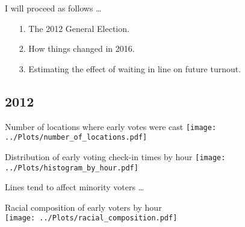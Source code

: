 \documentclass{beamer}
\begin{document}
		\begin{frame}
		I will proceed as follows \ldots
			\begin{itemize}
				\item[1.] The 2012 General Election.
				\item[2.] How things changed in 2016.
				\item[3.] Estimating the effect of waiting in line on future turnout.
			\end{itemize}
		\end{frame}
		
		\subsection{2012}
		
		\begin{frame}				
		\end{frame}
		
		\begin{frame}
		 Number of locations where early votes were cast			
			\centering
			\texttt{[image: ../Plots/number\_of\_locations.pdf]}
		\end{frame}
	
		\begin{frame}	
		Distribution of early voting check-in times by hour			
			\centering
			\texttt{[image: ../Plots/histogram\_by\_hour.pdf]}
		\end{frame}
		

		\begin{frame}				
		\centering Lines tend to affect minority voters \ldots
		\end{frame}

		\begin{frame}			
			\centering 
			Racial composition of early voters by hour	\\
			\texttt{[image: ../Plots/racial\_composition.pdf]}
		\end{frame}

%
%		
%		
		
\end{document}
